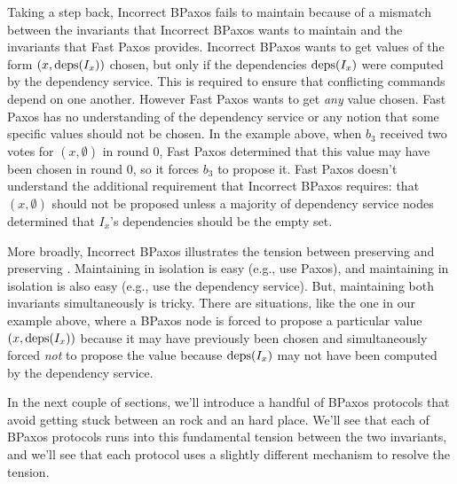 Taking a step back, Incorrect BPaxos fails to maintain
 because of a mismatch between the invariants that
Incorrect BPaxos wants to maintain and the invariants that Fast Paxos provides.
Incorrect BPaxos wants to get values of the form $(x, \text{deps}(I_x))$ chosen, but
only if the dependencies $\text{deps}(I_x)$ were computed by the dependency service.
This is required to ensure that conflicting commands depend on one another.
However Fast Paxos wants to get \emph{any} value chosen. Fast Paxos has no
understanding of the dependency service or any notion that some specific values
should not be chosen. In the example above, when $b_3$ received two votes for
$(x, \emptyset)$ in round $0$, Fast Paxos determined that this value may have
been chosen in round $0$, so it forces $b_3$ to propose it. Fast Paxos doesn't
understand the additional requirement that Incorrect BPaxos requires: that $(x,
\emptyset)$ should not be proposed unless a majority of dependency service
nodes determined that $I_x$'s dependencies should be the empty set.

More broadly, Incorrect BPaxos illustrates the tension between preserving
 and preserving .
Maintaining  in isolation is easy (e.g., use Paxos),
and maintaining  in isolation is also easy (e.g., use
the dependency service). But, maintaining both invariants simultaneously is
tricky. There are situations, like the one in our example above, where a
BPaxos node is forced to propose a particular value $(x, \text{deps}(I_x))$ because
it may have previously been chosen and simultaneously forced \emph{not} to
propose the value because $\text{deps}(I_x)$ may not have been computed by the
dependency service.

In the next couple of sections, we'll introduce a handful of BPaxos protocols
that avoid getting stuck between an  rock and an
 hard place.  We'll see that each of BPaxos protocols
runs into this fundamental tension between the two invariants, and we'll see
that each protocol uses a slightly different mechanism to resolve the tension.
